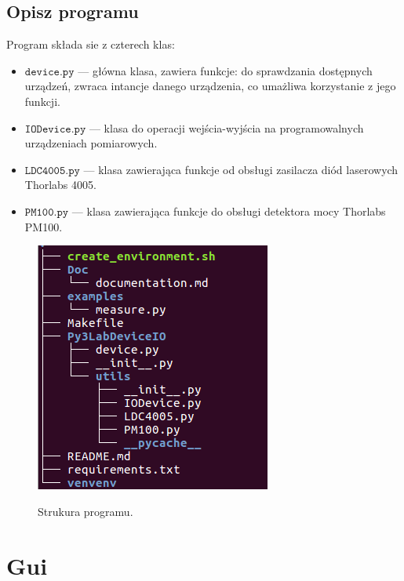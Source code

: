 \documentclass[a4paper, portrait,12pt]{report}
\begin{document}
\section{Opisz programu}
Program składa sie z czterech klas:
\begin{itemize}
\item $\mathtt{device.py}$ --- główna klasa, zawiera funkcje: do sprawdzania dostępnych urządzeń, 
zwraca intancje danego urządzenia, co umażliwa korzystanie z jego funkcji. 
\item $\mathtt{IODevice.py}$ --- klasa do operacji wejścia-wyjścia na programowalnych urządzeniach pomiarowych.
\item $\mathtt{LDC4005.py}$ --- klasa zawierająca funkcje od obsługi zasilacza diód laserowych Thorlabs 4005.
\item $\mathtt{PM100.py}$ --- klasa zawierająca funkcje do obsługi detektora mocy Thorlabs PM100.
\end{itemize}
\begin{figure}[h]
\center
  \includegraphics[scale=0.45]{tree.png}
  \label{rys1}
  \caption{Strukura programu.} 
\end{figure}

\newpage
\chapter{Gui}
\end{document}
